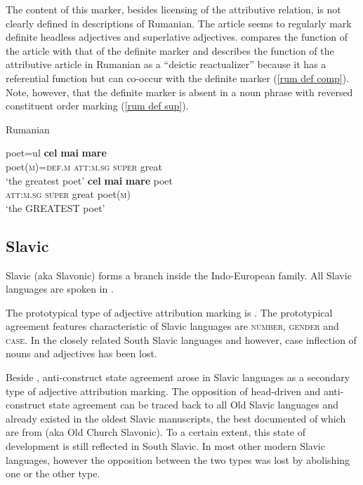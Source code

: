 The content of this marker, besides licensing of the attributive relation, is not clearly defined in descriptions of Rumanian. The article seems to regularly mark definite headless adjectives and superlative adjectives. \citet[141]{kramsky1972} compares the function of the article with that of the definite marker and describes the function of the attributive article in Rumanian as a “deictic reactualizer” because it has a referential function but can co-occur with the definite marker (\ref{rum def comp}). Note, however, that the definite marker is absent in a noun phrase with reversed constituent order marking  (\ref{rum def sup}).
\begin{exe}
\ex \rm{Rumanian \citep[93–94]{beyer-etal1987}}
\begin{xlist}
\label{rum def comp}%
\ex
\gll	poet=ul \textbf{cel} \textbf{mai} \textbf{mare}\\
	poet(\textsc{m})=\textsc{def.m} \textsc{att:m.sg} \textsc{super} great\\
\glt	‘the greatest poet’
\ex \label{rum def sup}
\gll	\textbf{cel} \textbf{mai} \textbf{mare} poet\\
	\textsc{att:m.sg} \textsc{super} great poet(\textsc{m})\\
\glt	‘the GREATEST poet’
\end{xlist}
\end{exe}

\subsection{Slavic}\label{slavic synchr}
Slavic (aka Slavonic) forms a branch inside the Indo-European family. All Slavic languages are spoken in .

The prototypical type of adjective attribution marking is . The prototypical agreement features characteristic of Slavic languages are \textsc{number}, \textsc{gender} and \textsc{case}. In the closely related South Slavic languages  and  however, case inflection of nouns and adjectives has been lost.

Beside , anti\hyp{}construct state agreement arose in Slavic languages as a secondary type of adjective attribution marking. The opposition of head\hyp{}driven and anti\hyp{}construct state agreement can be traced back to all Old Slavic languages and already existed in the oldest Slavic manuscripts, the best documented of which are from  (aka Old Church Slavonic). To a certain extent, this state of development is still reflected in South Slavic. In most other modern Slavic languages, however the opposition between the two types was lost by abolishing one or the other type.


